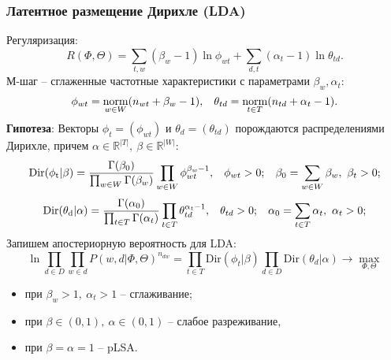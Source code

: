 \subsubsection{Латентное размещение Дирихле (LDA)}
Регуляризация:
\[R(\Phi, \Theta) = \sum\limits_{t,w} \left(\beta_w - 1\right)\ln \phi_{wt} + \sum\limits_{d,t} \left(\alpha_t - 1\right) \ln\theta_{td}.\]
М-шаг -- сглаженные частотные характеристики с параметрами $\beta_w, \alpha_t$:
\[\phi_{wt} = \underset{w\in W}{\mathrm{norm}}(n_{wt} + \beta_w - 1), \hspace*{0.3cm} \theta_{td} = \underset{t\in T}{\mathrm{norm}}(n_{td} + \alpha_t - 1).\]
\textbf{Гипотеза}: Векторы $\phi_t = \left(\phi_{wt}\right)$ и $\theta_d = \left(\theta_{td}\right)$ порождаются распределениями Дирихле, причем $\alpha \in \mathbb{R}^{|T|}, \ \beta \in \mathbb{R}^{|W|}:$
\[\mathrm{Dir(\phi_t| \beta)} = \dfrac{\Gamma(\beta_0)}{\prod_{w\in W}\Gamma (\beta_w)} \prod_{w\in W} \phi_{wt}^{\beta_w-1}, \hspace*{0.3cm} \phi_{wt} > 0; \hspace*{0.3cm} \beta_0 = \sum\limits_{w \in W} \beta_w, \ \beta_t > 0;\]
\[\mathrm{Dir(\theta_d| \alpha)} = \dfrac{\Gamma(\alpha_0)}{\prod_{t\in T}\Gamma (\alpha_t)} \prod_{t\in T} \theta_{td}^{\alpha_t-1}, \hspace*{0.3cm} \theta_{td} > 0; \hspace*{0.3cm} \alpha_0 = \sum\limits_{t \in T} \alpha_t, \ \alpha_t > 0;\]
Запишем апостериорную вероятность для LDA:
\[\ln \prod_{d\in D} \prod_{w\in d} P(w,d | \Phi, \Theta)^{n_{dw}} = \prod_{t \in T}\mathrm{Dir}(\phi_t| \beta) \prod_{d\in D} \mathrm{Dir}(\theta_d|\alpha) \to \max_{\Phi, \Theta}\]
\begin{itemize}
    \item при $\beta_w > 1, \ \alpha_t > 1$ -- сглаживание;
    \item при $\beta \in (0,1), \ \alpha\in (0,1)$ -- слабое разреживание,
    \item при $\beta = \alpha = 1$ -- pLSA. 
\end{itemize}

